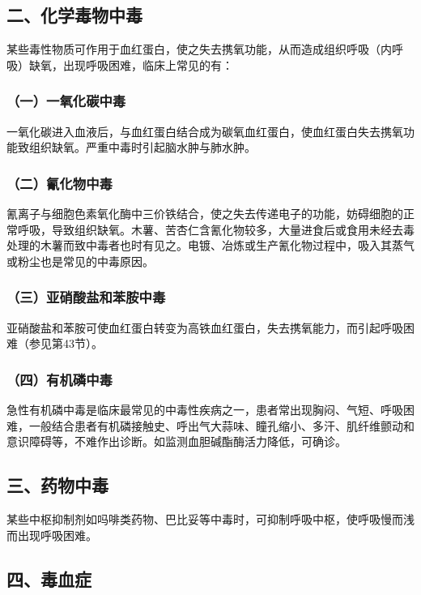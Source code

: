 \subsection{二、化学毒物中毒}

某些毒性物质可作用于血红蛋白，使之失去携氧功能，从而造成组织呼吸（内呼吸）缺氧，出现呼吸困难，临床上常见的有：

\subsubsection{（一）一氧化碳中毒}

一氧化碳进入血液后，与血红蛋白结合成为碳氧血红蛋白，使血红蛋白失去携氧功能致组织缺氧。严重中毒时引起脑水肿与肺水肿。

\subsubsection{（二）氰化物中毒}

氰离子与细胞色素氧化酶中三价铁结合，使之失去传递电子的功能，妨碍细胞的正常呼吸，导致组织缺氧。木薯、苦杏仁含氰化物较多，大量进食后或食用未经去毒处理的木薯而致中毒者也时有见之。电镀、冶炼或生产氰化物过程中，吸入其蒸气或粉尘也是常见的中毒原因。

\subsubsection{（三）亚硝酸盐和苯胺中毒}

亚硝酸盐和苯胺可使血红蛋白转变为高铁血红蛋白，失去携氧能力，而引起呼吸困难（参见第43节）。

\subsubsection{（四）有机磷中毒}

急性有机磷中毒是临床最常见的中毒性疾病之一，患者常出现胸闷、气短、呼吸困难，一般结合患者有机磷接触史、呼出气大蒜味、瞳孔缩小、多汗、肌纤维颤动和意识障碍等，不难作出诊断。如监测血胆碱酯酶活力降低，可确诊。

\subsection{三、药物中毒}

某些中枢抑制剂如吗啡类药物、巴比妥等中毒时，可抑制呼吸中枢，使呼吸慢而浅而出现呼吸困难。

\subsection{四、毒血症}

